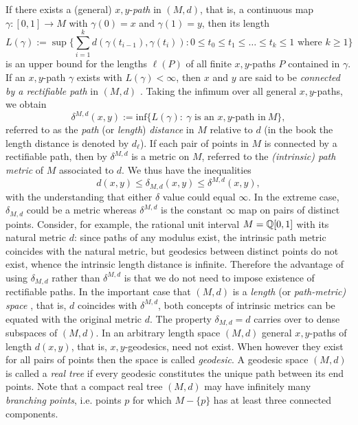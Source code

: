 \documentclass[11pt,a4paper]{amsart}
\theoremstyle{definition}
\numberwithin{equation}{section}
\newcommand{\MM}{\ensuremath{M}}
\begin{document}
If there exists a (general) $x,y$-{\it path} in $(\MM,d)$, that is, a continuous map $\gamma: [0,1] \rightarrow \MM$ with $\gamma(0)=x$ and $\gamma(1)=y$, then its length \cite[p.11]{Pa}
$$L(\gamma):=\sup \Big\{ \sum \limits ^k_{i=1}d(\gamma(t_{i-1}),\gamma(t_i)):
  0\le t_0\le t_1\le \ldots \le t_k\le 1 \mbox{ where } k\ge 1\Big\}$$
is an upper bound for the lengths $\ell(P)$ of all finite $x,y$-paths $P$ contained in $\gamma$. If an $x,y$-path $\gamma$ exists with $L(\gamma)<\infty$, then $x$ and $y$ are said to be {\it connected by a rectifiable path} in $(\MM,d)$ \cite[p.35]{Pa}. Taking the infimum over all general $x,y$-paths, we obtain
$$\delta^{\MM,d}(x,y):=\mbox{inf}\{ L(\gamma): ~\gamma \mbox{ is an } x,y\mbox{-path in} ~\MM\},$$
referred to as the {\it path} (or {\it length}) {\it distance} in $\MM$ relative to $d$ (in the book \cite{Pa} the length distance is denoted by $d_{\ell}$).
If each pair of points in $\MM$ is connected by a rectifiable path, then by \cite[Proposition 2.1.5]{Pa} $\delta^{\MM,d}$ is a metric on $\MM$, referred to
the {\it (intrinsic) path metric} of $\MM$ associated to $d.$ We thus have the inequalities
$$d(x,y)\le \delta_{\MM,d}(x,y)\le \delta^{\MM,d}(x,y),$$
with the understanding that either $\delta$ value could equal $\infty$. In the extreme case, $\delta_{\MM,d}$  could be a metric whereas
$\delta^{\MM,d}$ is the constant $\infty$ map on pairs of distinct points. Consider, for example, the rational unit interval $M =\mathbb{Q}\mbox [0,1]$
with its natural metric $d$: since paths of any modulus exist,
the intrinsic path metric coincides with the natural metric, but geodesics between distinct points do not exist, whence the intrinsic length distance is infinite.
Therefore the advantage of using $\delta_{\MM,d}$ rather than $\delta^{\MM,d}$  is that we do not need to impose existence of rectifiable paths. In the
important case that $(\MM,d)$ is a {\it length} (or  {\it  path-metric) space}  \cite[p.35]{Pa}, that is, $d$ coincides with $\delta^{\MM,d}$,
both concepts of intrinsic metrics can be equated with the original metric $d.$ The property $\delta_{\MM,d}=d$ carries over to dense subspaces of
$(\MM,d)$.  In an arbitrary length space $(\MM,d)$ general $x,y$-paths of length $d(x,y)$, that is, $x,y$-geodesics, need not exist. When however
they exist for all pairs of points then the space is called {\it geodesic}. A geodesic space $(\MM,d)$ is called a {\it real tree} if every
geodesic constitutes the unique path between its end points. Note that a compact real tree $({\MM},d)$ may have infinitely many
{\it branching points}, i.e. points $p$ for which ${\MM}- \{ p\}$ has at least three connected components.
\end{document}
